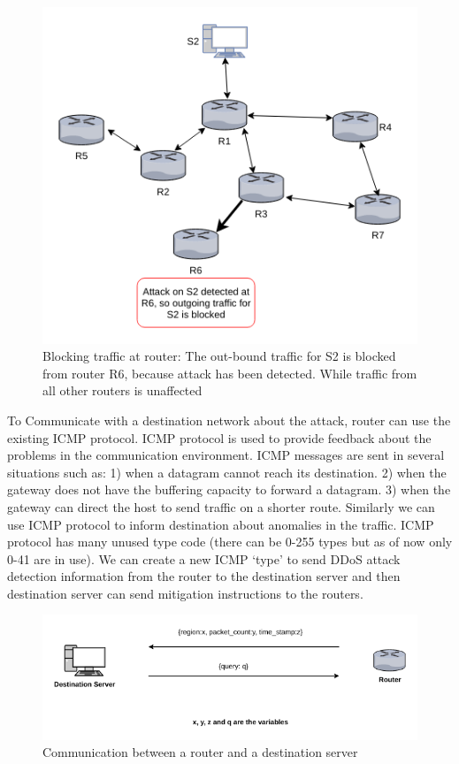 \documentclass[12pt,oneside,a4paper]{article}
\begin{document}
\begin{figure}[H]
\centering
\includegraphics[scale=0.60]{mitigation_path.png}
\caption{Blocking traffic at router: The out-bound traffic for S2 is blocked from router R6,
because attack has been detected. While traffic from all other routers is unaffected} \label{fig:mitigation_path}
\end{figure}

To Communicate with a destination network about the attack, router can use the existing ICMP protocol. ICMP protocol is used to provide feedback about the problems in the communication environment. ICMP messages are sent in several situations such as: 1) when a datagram cannot reach its destination. 2) when the gateway does not have the buffering capacity to forward a datagram. 3) when the gateway can direct the host to send traffic on a shorter route.\cite{icmp} Similarly we can use ICMP protocol to inform destination about anomalies in the traffic. ICMP protocol has many unused type code (there can be 0-255 types but as of now only 0-41 are in use). We can create a new ICMP `type' to send DDoS attack detection information from the router to the destination server and then destination server can send mitigation instructions to the routers.

\begin{figure}[H]
\centering
\includegraphics[scale=0.5]{router-network-communication.png}
\caption{Communication between a router and a destination server} \label{fig:router-network-communication}
\end{figure}
\end{document}
